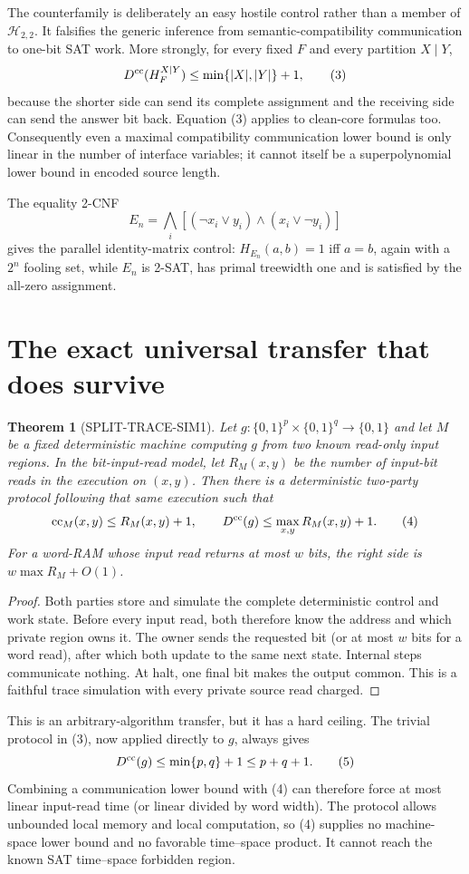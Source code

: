\documentclass[11pt]{article}
\newtheorem{theorem}{Theorem}
\newcommand{\Dcc}{D^{\rm cc}}
\begin{document}
The counterfamily is deliberately an easy hostile control rather than a
member of $\mathcal H_{2,2}$.  It falsifies the generic inference from
semantic-compatibility communication to one-bit SAT work.  More strongly,
for every fixed $F$ and every partition $X\mid Y$,
\[
 \Dcc(H_F^{X\mid Y})\le\min\{|X|,|Y|\}+1,                            \tag{3}
\]
because the shorter side can send its complete assignment and the receiving
side can send the answer bit back.  Equation (3) applies to clean-core
formulas too.  Consequently even a maximal compatibility communication
lower bound is only linear in the number of interface variables; it cannot
itself be a superpolynomial lower bound in encoded source length.

The equality 2-CNF
\[
 E_n=\bigwedge_i[(\neg x_i\vee y_i)\wedge(x_i\vee\neg y_i)]
\]
gives the parallel identity-matrix control: $H_{E_n}(a,b)=1$ iff $a=b$,
again with a $2^n$ fooling set, while $E_n$ is 2-SAT, has primal treewidth
one and is satisfied by the all-zero assignment.

\section{The exact universal transfer that does survive}
\begin{theorem}[SPLIT-TRACE-SIM1]
Let $g:\{0,1\}^p\times\{0,1\}^q\to\{0,1\}$ and let $M$ be a fixed
deterministic machine computing $g$ from two known read-only input regions.
In the bit-input-read model, let $R_M(x,y)$ be the number of input-bit reads
in the execution on $(x,y)$.  Then there is a deterministic two-party
protocol following that same execution such that
\[
 \operatorname{cc}_{M}(x,y)\le R_M(x,y)+1,
 \qquad
 \Dcc(g)\le \max_{x,y}R_M(x,y)+1.                                  \tag{4}
\]
For a word-RAM whose input read returns at most $w$ bits, the right side is
$w\max R_M+O(1)$.
\end{theorem}
\begin{proof}
Both parties store and simulate the complete deterministic control and work
state.  Before every input read, both therefore know the address and which
private region owns it.  The owner sends the requested bit (or at most $w$
bits for a word read), after which both update to the same next state.
Internal steps communicate nothing.  At halt, one final bit makes the output
common.  This is a faithful trace simulation with every private source read
charged.
\end{proof}

This is an arbitrary-algorithm transfer, but it has a hard ceiling.  The
trivial protocol in (3), now applied directly to $g$, always gives
\[
 \Dcc(g)\le\min\{p,q\}+1\le p+q+1.                                  \tag{5}
\]
Combining a communication lower bound with (4) can therefore force at most
linear input-read time (or linear divided by word width).  The protocol
allows unbounded local memory and local computation, so (4) supplies no
machine-space lower bound and no favorable time--space product.  It cannot
reach the known SAT time--space forbidden region.
\end{document}
